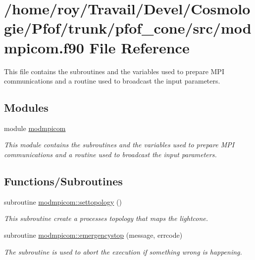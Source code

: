 \hypertarget{modmpicom_8f90}{}\section{/home/roy/\+Travail/\+Devel/\+Cosmologie/\+Pfof/trunk/pfof\+\_\+cone/src/modmpicom.f90 File Reference}
\label{modmpicom_8f90}


This file contains the subroutines and the variables used to prepare M\+PI communications and a routine used to broadcast the input parameters.  


\subsection*{Modules}
\begin{DoxyCompactItemize}
\item 
module \hyperlink{namespacemodmpicom}{modmpicom}
\begin{DoxyCompactList}\small\item\em This module contains the subroutines and the variables used to prepare M\+PI communications and a routine used to broadcast the input parameters. \end{DoxyCompactList}\end{DoxyCompactItemize}
\subsection*{Functions/\+Subroutines}
\begin{DoxyCompactItemize}
\item 
subroutine \hyperlink{namespacemodmpicom_a158a13b594a854025da3c47f32a493de}{modmpicom\+::settopology} ()
\begin{DoxyCompactList}\small\item\em This subroutine create a processes topology that maps the lightcone. \end{DoxyCompactList}\item 
subroutine \hyperlink{namespacemodmpicom_a75a2de7a16fce78b94bd79731a2fbd81}{modmpicom\+::emergencystop} (message, errcode)
\begin{DoxyCompactList}\small\item\em The subroutine is used to abort the execution if something wrong is happening. \end{DoxyCompactList}\end{DoxyCompactItemize}
